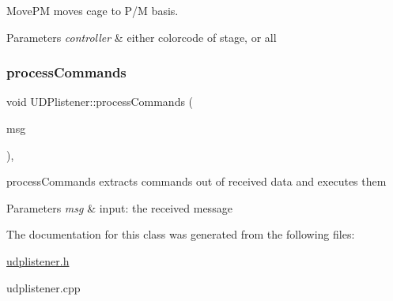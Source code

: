 Move\+PM moves cage to P/M basis. 


\begin{DoxyParams}{Parameters}
{\em controller} & either colorcode of stage, or \textquotesingle{}all\textquotesingle{} \\
\hline
\end{DoxyParams}
\mbox{\label{classUDPlistener_a86e1147a1adf1a32ae49d43529cd53f1}} 
\subsubsection{\texorpdfstring{process\+Commands}{processCommands}}
{\footnotesize\ttfamily void U\+D\+Plistener\+::process\+Commands (\begin{DoxyParamCaption}\item[{Q\+String}]{msg }\end{DoxyParamCaption})\hspace{0.3cm}{\ttfamily [private]}, {\ttfamily [slot]}}



process\+Commands extracts commands out of received data and executes them 


\begin{DoxyParams}{Parameters}
{\em msg} & input\+: the received message \\
\hline
\end{DoxyParams}


The documentation for this class was generated from the following files\+:\begin{DoxyCompactItemize}
\item 
\hyperlink{udplistener_8h}{udplistener.\+h}\item 
udplistener.\+cpp\end{DoxyCompactItemize}
